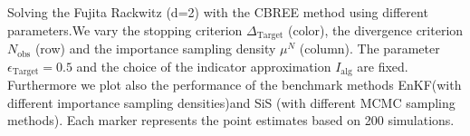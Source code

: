 Solving the Fujita Rackwitz (d=2) with the CBREE method using  different parameters.We vary the stopping criterion $\Delta_{\text{Target}}$ (color), the divergence criterion $N_\text{obs}$ (row) and the importance sampling density $\mu^N$ (column). The parameter $\epsilon_{\text{Target}} = 0.5$ and the choice of the indicator approximation $I_\text{alg}$ are fixed. Furthermore we plot also the performance of the benchmark methods EnKF(with different importance sampling densities)and SiS (with different MCMC sampling methods). Each marker represents the point estimates based on 200 simulations.